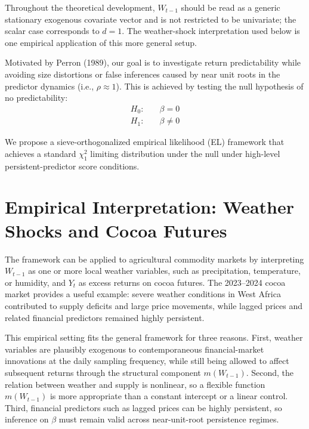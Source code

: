 \documentclass{article}
\begin{document}
Throughout the theoretical development, $W_{t-1}$ should be read as a generic
stationary exogenous covariate vector and is not restricted to be univariate;
the scalar case corresponds to $d=1$. The weather-shock interpretation used
below is one empirical application of this more general setup.

Motivated by Perron (1989), our goal is to investigate return predictability while avoiding size distortions or false inferences caused by near unit roots in the predictor dynamics (i.e., $\rho \approx 1$). This is achieved by testing the null hypothesis of no predictability:
\begin{equation} 
\begin{aligned}
    H_0: \quad &\beta = 0 \\
    H_1: \quad &\beta \neq 0
\end{aligned}
\end{equation}

We propose a sieve-orthogonalized empirical likelihood (EL) framework that achieves a standard $\chi^2_1$ limiting distribution under the null under high-level persistent-predictor score conditions.

\section{Empirical Interpretation: Weather Shocks and Cocoa Futures}

The framework can be applied to agricultural commodity markets by interpreting
$W_{t-1}$ as one or more local weather variables, such as precipitation,
temperature, or humidity, and $Y_t$ as excess returns on cocoa futures. The 2023--2024
cocoa market provides a useful example: severe weather conditions in West
Africa contributed to supply deficits and large price movements, while lagged
prices and related financial predictors remained highly persistent.

This empirical setting fits the general framework for three reasons. First,
weather variables are plausibly exogenous to contemporaneous financial-market
innovations at the daily sampling frequency, while still being allowed to
affect subsequent returns through the structural component $m(W_{t-1})$.
Second, the relation between weather and supply is nonlinear, so a flexible
function $m(W_{t-1})$ is more appropriate than a constant intercept or a
linear control. Third, financial predictors such as lagged prices can be
highly persistent, so inference on $\beta$ must remain valid across
near-unit-root persistence regimes.
\end{document}
